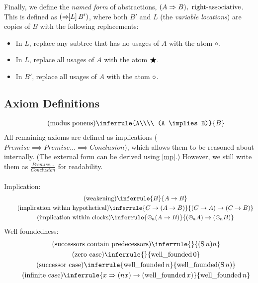 \documentclass{article}
\begin{document}
  Finally, we define the \emph{named form} of abstractions, $(\nameabstraction{A}B),\ \operatorname{right-associative}$.
  This is defined as $(\Rightarrow\hspace{-0.4em}[L]\,B')$, where both $B'$ and $L$ (the \emph{variable locations}) are copies of $B$ with the following replacements:
  \begin{itemize}
    \item In $L$, replace any subtree that has no usages of $A$ with the atom $\circ$.
    \item In $L$, replace all usages of $A$ with the atom $\bigstar$.
    \item In $B'$, replace all usages of $A$ with the atom $\circ$.
  \end{itemize}

  \subsection{Axiom Definitions}
  \setlength{\jot}{1.4em}
  \begin{gather*}
    \tag{modus ponens}\label{mp}
    \inferrule{A\\\\ (A \implies B)}{B}\\
  \end{gather*}
  All remaining axioms are defined as implications ($Premise \implies Premise \dots \implies Conclusion$), which allows them to be reasoned about internally. (The external form can be derived using \eqref{mp}.) However, we still write them as $\frac{Premise\dots}{Conclusion}$ for readability.
  \\\\
  Implication:
  \begin{gather*}
    \tag{weakening}
    \inferrule{B}{A \implies B}\\
    \tag{implication within hypothetical}
    \inferrule{C \implies (A \implies B)}{(C \implies A)\implies(C \implies B)}\\
    \tag{implication within clocks}
    \inferrule{\clocksub{n} (A \implies B)}{(\clocksub{n} A)\implies(\clocksub{n} B)}\\
  \end{gather*}
  Well-foundedness:
  \begin{gather*}
    \tag{successors contain predecessors}
    \inferrule{}{(\wfsucc n) n}\\
    \tag{zero case}
    \inferrule{}{\wellfounded \wfz}\\
    \tag{successor case}
    \inferrule{\wellfounded n}{\wellfounded (\wfsucc n)}\\
    \tag{infinite case}
    \inferrule{\nameabstraction{x}(n x) \implies (\wellfounded x)}{\wellfounded n}\\
  \end{gather*}
\end{document}
